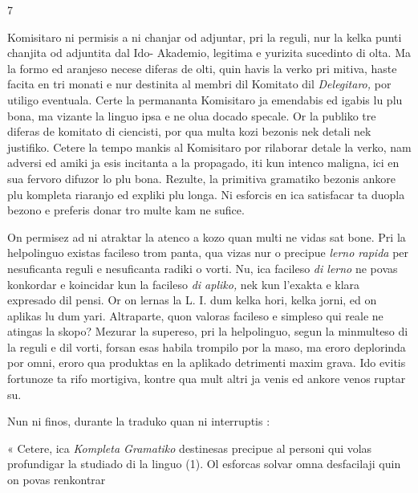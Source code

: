 \begin{VUpage}[11]{7}

\VUcontinue Komisitaro ni permisis a ni chanjar od adjuntar, pri la\nl
reguli, nur la kelka punti chanjita od adjuntita dal Ido-\nl
Akademio, legitima e yurizita sucedinto di olta. Ma la formo\nl
ed aranjeso necese diferas de olti, quin havis la verko pri\cc
mitiva, haste facita en tri monati e nur destinita al membri\nl
dil Komitato dil \textit{Delegitaro,} por utiligo eventuala. Certe la\nl
permananta Komisitaro ja emendabis ed igabis lu plu bona,\nl
ma vizante la linguo ipsa e ne olua docado specale. Or la\nl
publiko tre diferas de komitato di ciencisti, por qua multa\nl
kozi bezonis nek detali nek justifiko. Cetere la tempo mankis\nl
al Komisitaro por rilaborar detale la verko, nam adversi\nl
ed amiki ja esis incitanta a la propagado, iti kun intenco\nl
maligna, ici en sua fervoro difuzor lo plu bona. Rezulte, la\nl
primitiva gramatiko bezonis ankore plu kompleta riaranjo\nl
ed expliki plu longa. Ni esforcis en ica satisfacar ta duopla\nl
bezono e preferis donar tro multe kam ne sufice.

On permisez ad ni atraktar la atenco a kozo quan multi\nl
ne vidas sat bone. Pri la helpolinguo existas facileso trom\cc
panta, qua vizas nur o precipue \textit{lerno rapida} per nesuficanta\nl
reguli e nesuficanta radiki o vorti. Nu, ica facileso \textit{di lerno}\nl
ne povas konkordar e koincidar kun la facileso \textit{di apliko,} nek\nl
kun l'exakta e klara expresado dil pensi. Or on lernas la\nl
L. I. dum kelka hori, kelka jorni, ed on aplikas lu dum yari.\nl
Altraparte, quon valoras facileso e simpleso qui reale ne\nl
atingas la skopo? Mezurar la supereso, pri la helpolinguo,\nl
segun la minmulteso di la reguli e dil vorti, forsan esas\nl
habila trompilo por la maso, ma eroro deplorinda por omni,\nl
eroro qua produktas en la aplikado detrimenti maxim grava.\nl
Ido evitis fortunoze ta rifo mortigiva, kontre qua mult altri\nl
ja venis ed ankore venos ruptar su.

Nun ni finos, durante la traduko quan ni interruptis :

« Cetere, ica \textit{Kompleta Gramatiko} destinesas precipue al\nl
personi qui volas profundigar la studiado di la linguo (1).\nl
Ol esforcas solvar omna desfacilaji quin on povas renkontrar\parplein
\end{VUpage}

